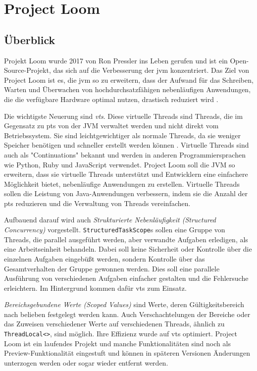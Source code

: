 \chapter{Project Loom}
\label{cha:ProjectLoom}

\section{Überblick}                                         %
\label{sec:Überblick}

    Projekt Loom wurde 2017 von Ron Pressler ins Leben gerufen und ist ein Open-Source-Projekt, 
    das sich auf die Verbesserung der \gls{jvm} konzentriert. Das Ziel von Project Loom ist es, 
    die \gls{jvm} so zu erweitern, dass der Aufwand für das Schreiben, Warten und Überwachen von hochdurchsatzfähigen nebenläufigen Anwendungen,
    die die verfügbare Hardware optimal nutzen, drastisch reduziert wird \cite{ProjectLoom}.

    Die wichtigste Neuerung sind \emph{\Glspl{vt}}.
    Diese virtuelle Threads sind Threads, die im Gegensatz zu \Glspl{pt} von der JVM verwaltet werden und nicht direkt vom Betriebssystem. 
    Sie sind leichtgewichtiger als normale Threads, da sie weniger Speicher benötigen und schneller erstellt werden können \cite{JEP444}.
    Virtuelle Threads sind auch als "Continuations" bekannt und werden in anderen Programmiersprachen wie Python, Ruby und JavaScript verwendet.
    Project Loom soll die JVM so erweitern, dass sie virtuelle Threads unterstützt und Entwicklern eine einfachere Möglichkeit bietet,
    nebenläufige Anwendungen zu erstellen. Virtuelle Threads sollen die Leistung von Java-Anwendungen verbessern, indem sie die Anzahl der \Glspl{pt} reduzieren und 
    die Verwaltung von Threads vereinfachen. 

    Aufbauend darauf wird auch \emph{Strukturierte Nebenläufigkeit (Structured Concurrency)} vorgestellt.
    \texttt{StructuredTaskScope}s sollen eine Gruppe von Threads, die parallel ausgeführt werden, aber verwandte Aufgaben erledigen, als eine Arbeitseinheit behandeln. 
    Dabei soll keine Sicherheit oder Kontrolle über die einzelnen Aufgaben eingebüßt werden, sondern Kontrolle über das Gesamtverhalten der Gruppe gewonnen werden.
    Dies soll eine parallele Ausführung von verschiedenen Aufgaben einfacher gestalten und die Fehlersuche erleichtern.
    Im Hintergrund kommen dafür \Glspl{vt} zum Einsatz. \cite{JEP453}

    \emph{Bereichsgebundene Werte (Scoped Values)} sind Werte, deren Gültigkeitsbereich nach belieben festgelegt werden kann.
    Auch Verschachtelungen der Bereiche oder das
    Zuweisen verschiedener Werte auf verschiedenen Threads, ähnlich zu \texttt{ThreadLocal<>}, sind möglich. Ihre Effizienz wurde auf \Glspl{vt} optimiert.
    \cite{JEP481}
    Project Loom ist ein laufendes Projekt und manche Funktionalitäten sind noch als Preview-Funktionalität eingestuft und können in späteren Versionen Änderungen 
    unterzogen werden oder sogar wieder entfernt werden.

